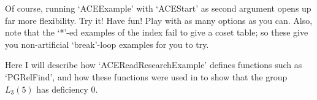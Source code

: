 Of course, running `ACEExample' with  `ACEStart'  as  second  argument
opens up far more flexibility. Try it! Have fun!  Play  with  as  many
options as you can. Also, note that the `*'-ed examples of  the  index
fail  to  give  a  coset  table;  so  these  give  you  non-artificial
`break'-loop examples for you to try.


Here I will describe how  `ACEReadResearchExample'  defines  functions
such  as  `PGRelFind',  and  how  these   functions   were   used   in
\cite{CHHR00} to show that the group $L_3(5)$ has deficiency 0.

